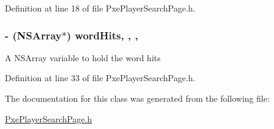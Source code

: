 Definition at line 18 of file Pxe\-Player\-Search\-Page.\-h.

\hypertarget{interface_pxe_player_search_page_a221899b9f7e9652b334ffc8d4450d31d}{
\subsubsection[{word\-Hits}]{\setlength{\rightskip}{0pt plus 5cm}-\/ (N\-S\-Array$\ast$) word\-Hits\hspace{0.3cm}{\ttfamily [read]}, {\ttfamily [write]}, {\ttfamily [nonatomic]}, {\ttfamily [strong]}}}\label{interface_pxe_player_search_page_a221899b9f7e9652b334ffc8d4450d31d}
A N\-S\-Array variable to hold the word hits 

Definition at line 33 of file Pxe\-Player\-Search\-Page.\-h.



The documentation for this class was generated from the following file\-:\begin{DoxyCompactItemize}
\item 
\hyperlink{_pxe_player_search_page_8h}{Pxe\-Player\-Search\-Page.\-h}\end{DoxyCompactItemize}
